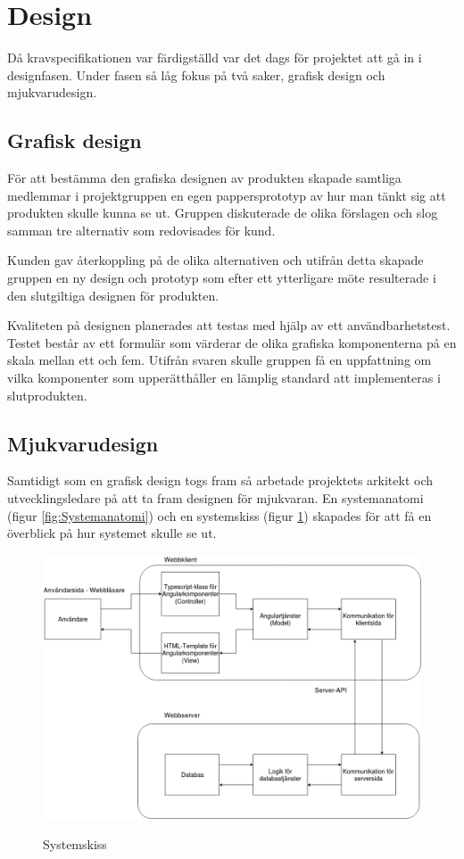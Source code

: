 \section{Design}
Då kravspecifikationen var färdigställd var det dags för projektet att gå in i designfasen. Under fasen så låg fokus på två saker, grafisk design och mjukvarudesign.

\subsection{Grafisk design}\label{sec:grafisk_design}
För att bestämma den grafiska designen av produkten skapade samtliga medlemmar i projektgruppen en egen pappersprototyp av hur man tänkt sig att produkten skulle kunna se ut. Gruppen diskuterade de olika förslagen och slog samman tre alternativ som redovisades för kund.

Kunden gav återkoppling på de olika alternativen och utifrån detta skapade gruppen en ny design och prototyp som efter ett ytterligare möte resulterade i den slutgiltiga designen för produkten.

Kvaliteten på designen planerades att testas med hjälp av ett användbarhetstest. Testet består av ett formulär som värderar de olika grafiska komponenterna på en skala mellan ett och fem. Utifrån svaren skulle gruppen få en uppfattning om vilka komponenter som upperätthåller en lämplig standard att implementeras i slutprodukten. 

\subsection{Mjukvarudesign}
Samtidigt som en grafisk design togs fram så arbetade projektets arkitekt och utvecklingsledare på att ta fram designen för mjukvaran. En systemanatomi (figur \ref{fig:Systemanatomi}) och en systemskiss (figur \ref{fig:Systemskiss}) skapades för att få en överblick på hur systemet skulle se ut. 


\begin{figure}[H]
    \includegraphics[width=\textwidth,height=.4\textheight]{Figures/Systemskiss.png}\\
    \caption{Systemskiss}
    \label{fig:Systemskiss}
\end{figure}

